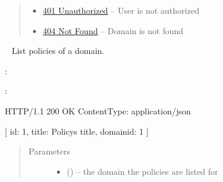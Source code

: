 \documentclass[letterpaper,10pt,english]{sphinxmanual}
\begin{document}
\begin{fulllineitems}
\begin{quote}
\begin{description}
\begin{itemize}
\item {} 
\href{http://www.w3.org/Protocols/rfc2616/rfc2616-sec10.html\#sec10.4.2}{401 Unauthorized} -- User is not authorized

\item {} 
\href{http://www.w3.org/Protocols/rfc2616/rfc2616-sec10.html\#sec10.4.5}{404 Not Found} -- Domain is not found

\end{itemize}

\end{description}\end{quote}

\end{fulllineitems}



\begin{fulllineitems}
\label{\detokenize{resources/domain:get--domains-(domain_id)-policies}}~
List policies of a domain.

:

\begin{sphinxVerbatim}[commandchars=\\\{\}]
  
 
 
\end{sphinxVerbatim}

:

\begin{sphinxVerbatim}[commandchars=\\\{\}]
HTTP/1.1 200 OK
Content\PYGZhy{}Type: application/json

[
    \PYGZob{}
        \PYGZsq{}id\PYGZsq{}: 1,
        \PYGZsq{}title\PYGZsq{}: \PYGZsq{}Policy\PYGZsq{}s title\PYGZsq{},
        \PYGZsq{}domain\PYGZus{}id\PYGZsq{}: 1
    \PYGZcb{}
]
\end{sphinxVerbatim}
\begin{quote}\begin{description}
\item[{Parameters}] \leavevmode\begin{itemize}
\item {} 
 () -- the domain the policies are listed for


\end{itemize}
\end{description}
\end{quote}
\end{fulllineitems}
\end{document}
